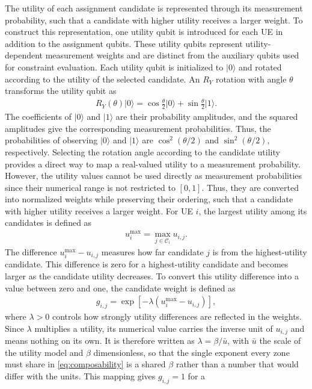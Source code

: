 \documentclass[journal]{IEEEtran}
\newcommand{\ket}[1]{\lvert #1 \rangle}
\begin{document}
{{The utility of each assignment candidate is represented through its measurement probability, such that a candidate with higher utility
receives a larger weight. To construct this representation, one utility qubit is introduced for each UE in addition to the assignment qubits.
These utility qubits represent utility-dependent measurement weights and are distinct from the auxiliary qubits used for constraint
evaluation. Each utility qubit is initialized to $\ket{0}$ and rotated according to the utility of the selected candidate. An $R_Y$ rotation
with angle $\theta$ transforms the utility qubit as
\begin{align}
R_Y(\theta)\ket{0}
=\cos\frac{\theta}{2}\ket{0}
+\sin\frac{\theta}{2}\ket{1}.
\label{eq:utility-rotation}
\end{align}
The coefficients of $\ket{0}$ and $\ket{1}$ are their probability amplitudes, and the squared amplitudes give the corresponding measurement probabilities. Thus, the probabilities of observing $\ket{0}$ and $\ket{1}$ are $\cos^2(\theta/2)$ and $\sin^2(\theta/2)$, respectively. Selecting the rotation angle according to the candidate utility provides a direct way to map a real-valued utility to a measurement probability.
However, the utility values cannot be used directly as measurement probabilities since their numerical range is not restricted to $[0,1]$. Thus, they are converted into normalized weights while preserving their ordering, such that a candidate with higher utility receives a larger weight. For UE $i$, the largest utility among its candidates is defined as
\begin{align}
u_i^{\max}=\max_{j\in\mathcal{C}_i}u_{i,j}.
\label{eq:max-utility}
\end{align}
The difference $u_i^{\max}-u_{i,j}$ measures how far candidate $j$ is from the highest-utility candidate. This difference is zero for
a highest-utility candidate and becomes larger as the candidate utility decreases.
To convert this utility difference into a value between zero and one,
the candidate weight is defined as
\begin{align}
g_{i,j}
=\exp\!\left[-\lambda\left(u_i^{\max}-u_{i,j}\right)
\right],
\label{eq:utility-weight}
\end{align}
where $\lambda>0$ controls how strongly utility differences are reflected in the weights. Since $\lambda$ multiplies a utility, its numerical value carries the inverse unit of $u_{i,j}$ and means nothing on its own. It is therefore written as $\lambda=\beta/\bar{u}$, with $\bar{u}$ the scale of the utility model and $\beta$ dimensionless, so that the single exponent every zone must share in \eqref{eq:composability} is a shared $\beta$ rather than a number that would differ with the units. This mapping gives $g_{i,j}=1$ for a
}}
\end{document}
